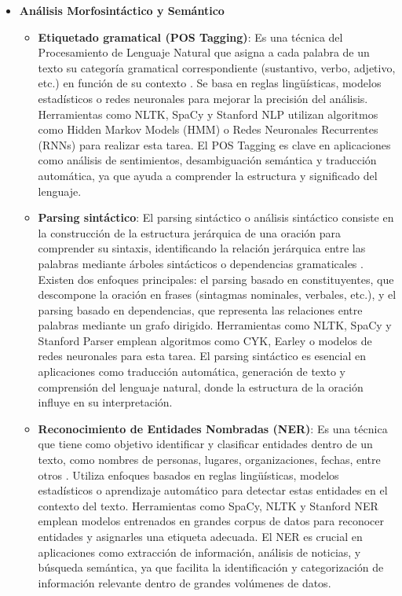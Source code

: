 \begin{itemize}
        \item \textbf{Análisis Morfosintáctico y Semántico}
        \begin{itemize}
            \item \textbf{Etiquetado gramatical (POS Tagging)}: Es una técnica del Procesamiento de Lenguaje Natural que asigna a cada palabra de un texto su categoría gramatical correspondiente (sustantivo, verbo, adjetivo, etc.) en función de su contexto \cite{postagging}. 
            Se basa en reglas lingüísticas, modelos estadísticos o redes neuronales para mejorar la precisión del análisis. 
            Herramientas como NLTK, SpaCy y Stanford NLP utilizan algoritmos como Hidden Markov Models (HMM) o Redes Neuronales Recurrentes (RNNs) para realizar esta tarea. 
            El POS Tagging es clave en aplicaciones como análisis de sentimientos, desambiguación semántica y traducción automática, ya que ayuda a comprender la estructura y significado del lenguaje.
            
            \item \textbf{Parsing sintáctico}: El parsing sintáctico o análisis sintáctico consiste en la construcción de la estructura jerárquica de una oración para comprender su sintaxis, identificando la relación jerárquica entre las palabras mediante árboles sintácticos o dependencias gramaticales \cite{zhang2020surveysyntacticsemanticparsingbased}. 
            Existen dos enfoques principales: el parsing basado en constituyentes, que descompone la oración en frases (sintagmas nominales, verbales, etc.), y el parsing basado en dependencias, que representa las relaciones entre palabras mediante un grafo dirigido. 
            Herramientas como NLTK, SpaCy y Stanford Parser emplean algoritmos como CYK, Earley o modelos de redes neuronales para esta tarea. 
            El parsing sintáctico es esencial en aplicaciones como traducción automática, generación de texto y comprensión del lenguaje natural, donde la estructura de la oración influye en su interpretación.
            
            \item \textbf{Reconocimiento de Entidades Nombradas (NER)}: Es una técnica que tiene como objetivo identificar y clasificar entidades dentro de un texto, como nombres de personas, lugares, organizaciones, fechas, entre otros \cite{roy2021recenttrendsnamedentity}. 
            Utiliza enfoques basados en reglas lingüísticas, modelos estadísticos o aprendizaje automático para detectar estas entidades en el contexto del texto. 
            Herramientas como SpaCy, NLTK y Stanford NER emplean modelos entrenados en grandes corpus de datos para reconocer entidades y asignarles una etiqueta adecuada. 
            El NER es crucial en aplicaciones como extracción de información, análisis de noticias, y búsqueda semántica, ya que facilita la identificación y categorización de información relevante dentro de grandes volúmenes de datos.
        \end{itemize}


\end{itemize}
